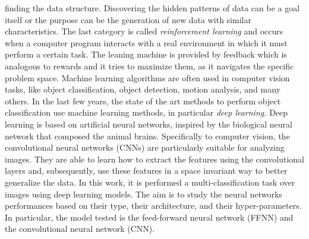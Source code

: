 finding the data structure. Discovering the hidden patterns of data can
be a goal itself or the purpose can be the generation of new data with
similar characteristics. The last category is called \emph{reinforcement
learning} and occurs when a computer program interacts with a real
environment in which it must perform a certain task. The leaning machine
is provided by feedback which is analogous to rewards and it tries to
maximize them, as it navigates the specific problem space. Machine
learning algorithms are often used in computer vision tasks, like object
classification, object detection, motion analysis, and many others. In
the last few years, the state of the art methods to perform object
classification use machine learning methods, in particular \emph{deep learning.}
Deep learning is based on artificial neural networks, inspired by the
biological neural network that composed the animal brains. Specifically
to computer vision, the convolutional neural networks (CNNs) are
particularly suitable for analyzing images. They are able to learn how
to extract the features using the convolutional layers and,
subsequently, use these features in a space invariant way to better
generalize the data. In this work, it is performed a
multi-classification task over images using deep
learning models. The aim is to study the neural networks performances
based on their type, their architecture, and their hyper-parameters. In
particular, the model tested is the feed-forward neural network (FFNN)
and the convolutional neural network (CNN).